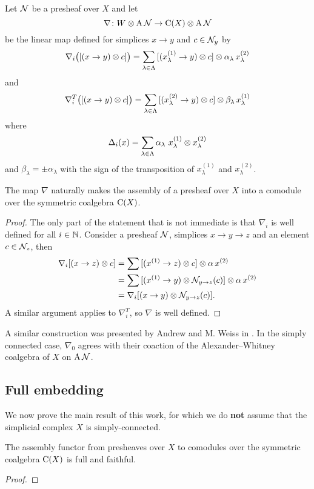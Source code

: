 Let $\mathcal{N}$ be a presheaf over $X$ and let
\[
\nabla \colon W \otimes \operatorname{A} \mathcal{N} \to \operatorname{C}(X) \otimes \operatorname{A} \mathcal{N}
\]
be the linear map defined for simplices $x \to y$ and $c \in \mathcal{N}_y$ by
\[
\nabla_i \big( [(x \to y) \otimes c] \big) =
\sum_{\lambda \in \Lambda} {[(x_\lambda^{(1)} \to y) \otimes c]} \otimes \alpha_\lambda \, x_\lambda^{(2)}
\]
and
\[
\nabla_i^T \big( [(x \to y) \otimes c] \big) =
\sum_{\lambda \in \Lambda} {[(x_\lambda^{(2)} \to y) \otimes c]} \otimes \beta_\lambda \, x_\lambda^{(1)}
\]
where
\[
\operatorname{\Delta}_i(x) = \sum_{\lambda \in \Lambda} \alpha_\lambda \ x_\lambda^{(1)} \otimes x_\lambda^{(2)}
\]
and
$\beta_\lambda = \pm \alpha_\lambda$ with the sign of the transposition of $x_\lambda^{(1)}$ and $x_\lambda^{(2)}$.

\begin{lemma*}
	The map $\nabla$ naturally makes the assembly of a presheaf over $X$ into a comodule over the symmetric coalgebra $\operatorname{C}(X)$.
\end{lemma*}

\begin{proof}
	The only part of the statement that is not immediate is that $\nabla_i$ is well defined for all $i \in \mathbb{N}$.
	Consider a presheaf $\mathcal{N}$, simplices $x \to y \to z$ and an element $c \in \mathcal{N}_z$, then
	\begin{align*}
		\nabla_i [(x \to z) \otimes c] &=
		\sum {[(x^{(1)} \to z) \otimes c]} \otimes \alpha \, x^{(2)} \\ &=
		\sum {[(x^{(1)} \to y) \otimes\mathcal{N}_{y \to z}(c)]} \otimes \alpha \, x^{(2)} \\ &=
		\nabla_i [(x \to y) \otimes \mathcal{N}_{y \to z}(c)].
	\end{align*}
	A similar argument applies to $\nabla^T_i$,	so $\nabla$ is well defined.
\end{proof}

A similar construction was presented by Andrew and M. Weiss in \cite[Proposition~5.3]{ranicki1990assembly}.
In the simply connected case, $\nabla_0$ agrees with their coaction of the Alexander--Whitney coalgebra of $X$ on $\operatorname{A} \mathcal{N}$.

\subsection{Full embedding} \label{ss:full embedding}

We now prove the main result of this work, for which we do \textbf{not} assume that the simplicial complex $X$ is simply-connected.

\begin{theorem*}
	The assembly functor from presheaves over $X$ to comodules over the symmetric coalgebra $\operatorname{C}(X)$ is full and faithful.
\end{theorem*}

\begin{proof}
	
\end{proof}